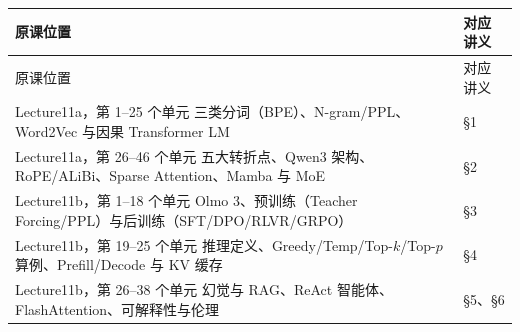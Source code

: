 \begingroup\small\setlength{\tabcolsep}{3pt}\renewcommand{\arraystretch}{1.22}
\begin{longtable}{@{}>{\raggedright\arraybackslash}p{}>{\raggedright\arraybackslash}p{}@{}}
\toprule
原课位置 & 对应讲义 \\
\midrule\endfirsthead
原课位置 & 对应讲义 \\
\midrule\endhead
\bottomrule\endfoot
Lecture11a，第 1–25 个单元 三类分词（BPE）、N-gram/PPL、Word2Vec 与因果 Transformer LM & §1 \\
Lecture11a，第 26–46 个单元 五大转折点、Qwen3 架构、RoPE/ALiBi、Sparse Attention、Mamba 与 MoE & §2 \\
Lecture11b，第 1–18 个单元 Olmo 3、预训练（Teacher Forcing/PPL）与后训练（SFT/DPO/RLVR/GRPO） & §3 \\
Lecture11b，第 19–25 个单元 推理定义、Greedy/Temp/Top-$k$/Top-$p$ 算例、Prefill/Decode 与 KV 缓存 & §4 \\
Lecture11b，第 26–38 个单元 幻觉与 RAG、ReAct 智能体、FlashAttention、可解释性与伦理 & §5、§6 \\
\end{longtable}\endgroup
